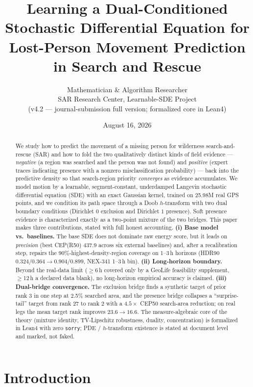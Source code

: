 \documentclass[11pt]{article}
\title{Learning a Dual-Conditioned Stochastic Differential Equation for
Lost-Person Movement Prediction in Search and Rescue}
\author{Mathematician \& Algorithm Researcher\\
SAR Research Center, Learnable-SDE Project\\
(v4.2 --- journal-submission full version; formalized core in Lean4)}
\date{August 16, 2026}
\begin{document}
\maketitle

\begin{abstract}
We study how to predict the movement of a missing person for wilderness
search-and-rescue (SAR) and how to fold the two qualitatively distinct kinds
of field evidence --- \emph{negative} (a region was searched and the person was
not found) and \emph{positive} (expert traces indicating presence with a
nonzero misclassification probability) --- back into the predictive density so
that search-region priority \emph{converges} as evidence accumulates. We model
motion by a learnable, segment-constant, underdamped Langevin
stochastic differential equation (SDE) with an exact Gaussian kernel, trained
on 25.98M real GPS points, and we condition its path space through a Doob
$h$-transform with two dual boundary conditions (Dirichlet $0$ exclusion and
Dirichlet $1$ presence). Soft presence evidence is characterized exactly as a
two-point mixture of the two bridges. This paper makes three contributions,
stated with full honest accounting. \textbf{(i) Base model vs.\ baselines.}
The base SDE does not dominate raw energy score, but it leads on
\emph{precision} (best CEP(R50) $437.9$ across six external baselines) and,
after a recalibration step, repairs the 90\%-highest-density-region coverage on
1--3\,h horizons (HDR90 $0.324/0.364\to 0.904/0.899$, NEX-341 1--3\,h bin). \textbf{(ii) Long-horizon
boundary.} Beyond the real-data limit ($\ge$6\,h covered only by a GeoLife
feasibility supplement, $\ge$12\,h a declared data blank), no long-horizon
empirical accuracy is claimed. \textbf{(iii) Dual-bridge convergence.} The
exclusion bridge finds a synthetic target of prior rank 3 in one step at 2.5\%
searched area, and the presence bridge collapses a ``surprise-tail'' target from
rank 27 to rank 2 with a $4.5\times$ CEP50 search-area reduction; on real legs
the mean target rank improves $23.6\to16.6$. The measure-algebraic core of the
theory (mixture identity, TV-Lipschitz robustness, duality, concentration) is
formalized in Lean4 with zero \texttt{sorry}; PDE / $h$-transform existence is
stated at document level and marked, not faked.
\end{abstract}

\section{Introduction}
\label{sec:intro}
\end{document}
